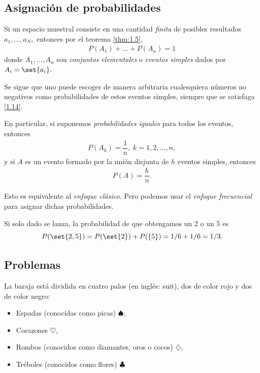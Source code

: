 \subsection{Asignación de probabilidades}
 {}
 Si un espacio muestral consiste en una cantidad \emph{finita} de posibles resultados $a_{1},...,a_{N},$ entonces por el teorema \ref{thm:1.5},
 \begin{align}
  \label{1.14}
  P(A_{1})+...+P(A_{n})=1
 \end{align}
 donde $A_{1},...,A_{n}$ son \emph{conjuntos elementales} o \emph{eventos simples} dados por $A_{i}=\set{a_{i}}.$


{}
Se sigue que uno puede escoger de manera arbitraria cualesquiera números no negativos como probabilidades de estos eventos simples, siempre que se satisfaga \eqref{1.14}. 

En particular, si suponemos \emph{probabilidades iguales} para todos los eventos, entonces
\begin{align}
 \label{1.15}
 P(A_{k})=\dfrac{1}{n}, \; k=1,2,...,n,
\end{align}
y si $A$ es un evento formado por la unión disjunta de $h$ eventos simples, entonces
\begin{align}
	\label{1.16}
 P(A)=\dfrac{h}{n}.
\end{align}


{}
\begin{rem}
 Esto es equivalente al \textit{enfoque clásico.} Pero podemos usar el \textit{enfoque frecuencial} para asignar dichas probabilidades.
\end{rem}


{}
\begin{ejemplo}
 \label{exmp:1.12}
 Si solo dado se lanza, la probabilidad de que obtengamos un 2 o un 5 es 
 \[ P(\set{2,5}) = P(\set{2}) + P(\{5\}) = 1/6 + 1/6 = 1/3. \]
\end{ejemplo}



 \subsection{Problemas}
 
 La baraja está dividida en cuatro palos (en inglés: suit), dos de color rojo y dos de color negro:
 \begin{itemize}
  \item Espadas (conocidas como picas) $\spadesuit$,
  \item Corazones $\heartsuit$,
  \item Rombos (conocidos como diamantes, oros o cocos) $ \diamondsuit$,
  \item Tréboles (conocidos como flores) $\clubsuit$
 \end{itemize}
 
